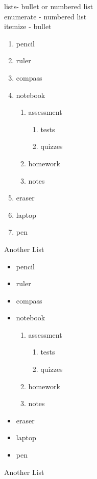 \documentclass[10pt]{article}
\begin{document}
lists- bullet or numbered list\\
enumerate - numbered list\\
itemize - bullet \\ 
\begin{enumerate}
\item pencil
\item ruler
\item compass
\item notebook
	\begin{enumerate}
	\item assessment
		\begin{enumerate}
		\item tests
		\item quizzes
		\end{enumerate}
	\item homework
	\item notes
	\end{enumerate}
\item eraser
\item laptop
\item pen
\end{enumerate}

Another List \\

\begin{itemize}
\item pencil
\item ruler
\item compass
\item notebook
	\begin{enumerate}
	\item assessment
		\begin{enumerate}
		\item tests
		\item quizzes
		\end{enumerate}
	\item homework
	\item notes
	\end{enumerate}
\item eraser
\item laptop
\item pen
\end{itemize}

Another List \\
\end{document}
